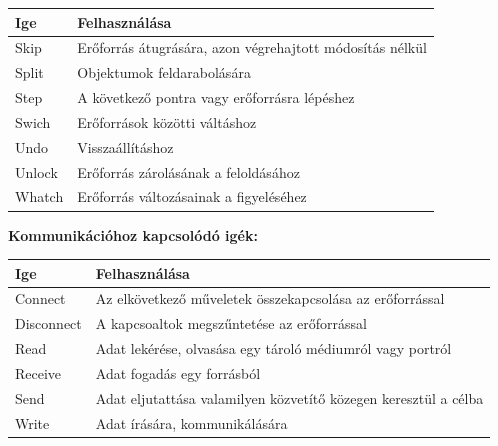 \documentclass[12pt,oneside,justify,table]{book}
\begin{document}
\begin{appendices}
\noindent
\begin{tabularx}{\linewidth}{l|X}
\rowcolor{blue!50}
\textbf{Ige} & \textbf{Felhasználása} \\
\hline
Skip & Erőforrás átugrására, azon végrehajtott módosítás nélkül \\
Split & Objektumok feldarabolására \\
Step & A következő pontra vagy erőforrásra lépéshez \\
Swich & Erőforrások közötti váltáshoz \\
Undo & Visszaállításhoz \\
Unlock & Erőforrás zárolásának a feloldásához \\
Whatch & Erőforrás változásainak a figyeléséhez \\
\end{tabularx}
\break

\noindent \textbf{Kommunikációhoz kapcsolódó igék:} \cite{VerbsCommunication}\\
\begin{tabularx}{\linewidth}{l|X}
\rowcolor{blue!50}
\textbf{Ige} & \textbf{Felhasználása} \\
\hline
Connect & Az elkövetkező műveletek összekapcsolása az erőforrással \\
Disconnect & A kapcsoaltok megszűntetése az erőforrással \\
Read & Adat lekérése, olvasása egy tároló médiumról vagy portról \\
Receive & Adat fogadás egy forrásból \\
Send & Adat eljutattása valamilyen közvetítő közegen keresztül a célba \\
Write & Adat írására, kommunikálására \\
\end{tabularx}
\break


\end{appendices}
\end{document}
